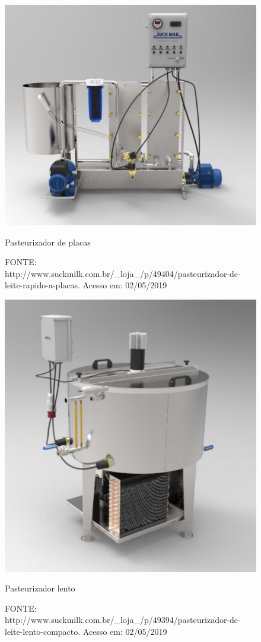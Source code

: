 \documentclass[10pt,a4paper]{article}
\begin{document}
\begin{figure}[H]
    \centering
    \includegraphics[scale=0.6]{Figuras/pasteu_leite_placas2.png}
    \caption{Pasteurizador de placas}
    \caption*{FONTE: http://www.suckmilk.com.br/\_loja\_/p/49404/pasteurizador-de-leite-rapido-a-placas. Acesso em: 02/05/2019}
    \label{fig_pasteurizador1}
\end{figure}

\begin{figure}[H]
    \centering
    \includegraphics[scale = 0.68]{Figuras/Pasteurizador_Leite.png}
    \caption{Pasteurizador lento}
    \caption*{FONTE: http://www.suckmilk.com.br/\_loja\_/p/49394/pasteurizador-de-leite-lento-compacto. Acesso em: 02/05/2019}
    \label{fig_pasteurizador2}
\end{figure}
\end{document}
